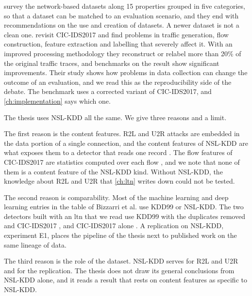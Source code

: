 \citet{ring2019survey} survey the network-based datasets along 15 properties
grouped in five categories, so that a dataset can be matched to an evaluation
scenario, and they end with recommendations on the use and creation of
datasets. A newer dataset is not a clean one. \citet{engelen2021troubleshooting}
revisit CIC-IDS2017 and find problems in traffic generation, flow construction,
feature extraction and labelling that severely affect it. With an improved
processing methodology they reconstruct or relabel more than 20\% of the
original traffic traces, and benchmarks on the result show significant
improvements. Their study shows how problems in data collection can
change the outcome of an evaluation, and we read this as the reproducibility
side of the debate. The benchmark uses a corrected variant of CIC-IDS2017, and
\cref{ch:implementation} says which one.

The thesis uses NSL-KDD all the same. We give three reasons and a limit.

The first reason is the content features. R2L and U2R attacks are embedded in
the data portion of a single connection, and the content features of NSL-KDD
are what exposes them to a detector that reads one record
\citep{tavallaee2009kddcup99}. The flow features of CIC-IDS2017 are statistics
computed over each flow \citep{sharafaldin2018cicids2017}, and we note that none
of them is a content feature of the NSL-KDD kind.
Without NSL-KDD, the knowledge about R2L and U2R that \cref{ch:ltn} writes down
could not be tested.

The second reason is comparability. Most of the machine learning and deep
learning entries in the table of Bizzarri et al. use KDD99 or NSL-KDD. The two
detectors built with an \gls{ltn} that we read use KDD99 with the duplicates
removed and CIC-IDS2017 \citep{onchis2022neurosymbolic}, and CIC-IDS2017 alone
\citep{bizzarri2024nsaids}. A replication on NSL-KDD, experiment E1, places the
pipeline of the thesis next to published work on the same lineage of data.

The third reason is the role of the dataset. NSL-KDD serves for R2L and U2R and
for the replication. The thesis does not draw its general conclusions from
NSL-KDD alone, and it reads a result that rests on content features as specific
to NSL-KDD.

